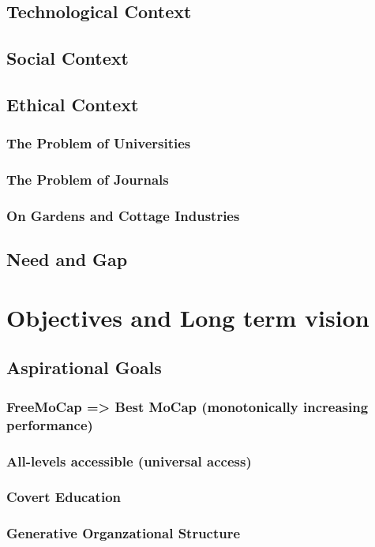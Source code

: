 \documentclass[11pt]{article}
\begin{document}
\subsection{Technological Context}
\subsection{Social Context}
\subsection{Ethical Context}
\subsubsection{The Problem of Universities}
\subsubsection{The Problem of Journals}
\subsubsection{On Gardens and Cottage Industries}
\subsection{Need and Gap}

\section{Objectives and Long term vision}
\subsection{Aspirational Goals}
\subsubsection{FreeMoCap => Best MoCap (monotonically increasing performance)}
\subsubsection{All-levels accessible (universal access)}
\subsubsection{Covert Education}
\subsubsection{Generative Organzational Structure}
\end{document}
